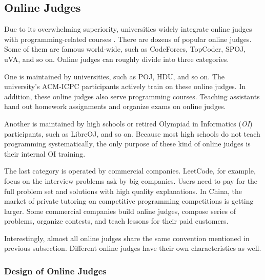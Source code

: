     \subsection{Online Judges}

        Due to its overwhelming superiority,
        universities widely integrate online judges with programming-related courses \cite{Li2005}.
        There are dozens of popular online judges.
        Some of them are famous world-wide, such as CodeForces, TopCoder, SPOJ, uVA, and so on. %
        Online judges can roughly divide into three categories.

        One is maintained by universities, such as POJ, HDU, and so on. %
        The university's ACM-ICPC participants actively train on these online judges.
        In addition, these online judges also serve programming courses.
        Teaching assistants hand out homework assignments and organize exams on online judges.

        Another is maintained by high schools
        or retired Olympiad in Informatics (\emph{OI}) participants,
        such as LibreOJ, and so on. %
        Because most high schools do not teach programming systematically,
        the only purpose of these kind of online judges is their internal OI training.

        The last category is operated by commercial companies. %
        LeetCode, for example, focus on the interview problems ask by big companies.
        Users need to pay for the full problem set and solutions with high quality explanations.
        In China, the market of private tutoring on competitive programming competitions is getting larger.
        Some commercial companies build online judges, compose series of problems, organize contests,
        and teach lessons for their paid customers.

        Interestingly, almost all online judges share the same convention mentioned in previous subsection.
        Different online judges have their own characteristics as well.

        \subsubsection{Design of Online Judges}

